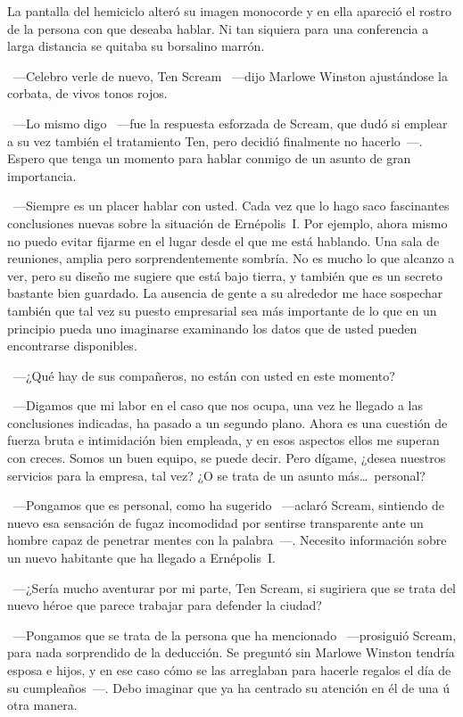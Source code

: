 La pantalla del hemiciclo alteró su imagen monocorde y en ella apareció el rostro de la persona con que deseaba hablar. Ni tan siquiera para una conferencia a larga distancia se quitaba su borsalino marrón.

~---Celebro verle de nuevo, Ten Scream ~---dijo Marlowe Winston ajustándose la corbata, de vivos tonos rojos.

~---Lo mismo digo ~---fue la respuesta esforzada de Scream, que dudó si emplear a su vez también el tratamiento Ten, pero decidió finalmente no hacerlo~---. Espero que tenga un momento para hablar conmigo de un asunto de gran importancia.

~---Siempre es un placer hablar con usted. Cada vez que lo hago saco fascinantes conclusiones nuevas sobre la situación de Ernépolis~I. Por ejemplo, ahora mismo no puedo evitar fijarme en el lugar desde el que me está hablando. Una sala de reuniones, amplia pero sorprendentemente sombría. No es mucho lo que alcanzo a ver, pero su diseño me sugiere que está bajo tierra, y también que es un secreto bastante bien guardado. La ausencia de gente a su alrededor me hace sospechar también que tal vez su puesto empresarial sea más importante de lo que en un principio pueda uno imaginarse examinando los datos que de usted pueden encontrarse disponibles.

~---¿Qué hay de sus compañeros, no están con usted en este momento?

~---Digamos que mi labor en el caso que nos ocupa, una vez he llegado a las conclusiones indicadas, ha pasado a un segundo plano. Ahora es una cuestión de fuerza bruta e intimidación bien empleada, y en esos aspectos ellos me superan con creces. Somos un buen equipo, se puede decir. Pero dígame, ¿desea nuestros servicios para la empresa, tal vez? ¿O se trata de un asunto más\dots\ personal?

~---Pongamos que es personal, como ha sugerido ~---aclaró Scream, sintiendo de nuevo esa sensación de fugaz incomodidad por sentirse transparente ante un hombre capaz de penetrar mentes con la palabra~---. Necesito información sobre un nuevo habitante que ha llegado a Ernépolis~I.

~---¿Sería mucho aventurar por mi parte, Ten Scream, si sugiriera que se trata del nuevo héroe que parece trabajar para defender la ciudad?

~---Pongamos que se trata de la persona que ha mencionado ~---prosiguió Scream, para nada sorprendido de la deducción. Se preguntó sin Marlowe Winston tendría esposa e hijos, y en ese caso cómo se las arreglaban para hacerle regalos el día de su cumpleaños~---. Debo imaginar que ya ha centrado su atención en él de una ú otra manera.

